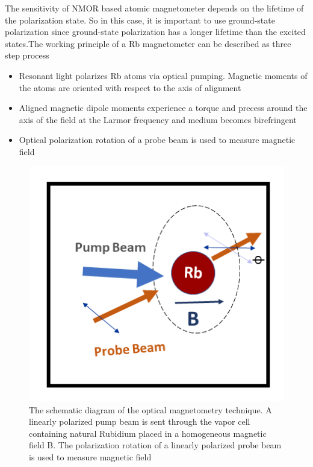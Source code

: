 The sensitivity of NMOR based atomic magnetometer depends on the lifetime of the polarization state. So in this case, it is important to use ground-state polarization since ground-state polarization has a longer lifetime than the excited states.The working principle of a Rb magnetometer can be described as three step process
\begin{itemize}
\item
Resonant light polarizes Rb atoms via optical pumping. Magnetic
moments of the atoms are oriented with respect to the axis of
alignment
\end{itemize}
\begin{itemize}
\item Aligned magnetic dipole moments experience a torque and precess
  around the axis of the field at the Larmor frequency and medium
  becomes birefringent
\end{itemize}
\begin{itemize}
\item Optical polarization rotation of a probe beam is used to measure
  magnetic field
\end{itemize}
\begin{figure}[h]
\centering
\includegraphics[width=0.55\linewidth]{figures/optical_pumping}
\caption{The schematic diagram of the optical magnetometry technique.
  A linearly polarized pump beam is sent through the vapor cell
  containing natural Rubidium placed in a homogeneous magnetic field
  B.  The polarization rotation of a linearly polarized probe beam is
  used to measure magnetic field}
\end{figure}
